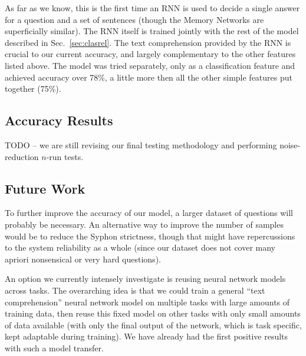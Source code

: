 \documentclass[11pt,a4paper]{article}
\begin{document}
As far as we know, this is the first time an RNN is used to decide a single answer for a question and a set of sentences (though the Memory Networks are superficially similar).
The RNN itself is trained jointly with the rest of the model described in Sec.~\ref{sec:clasrel}.
The text comprehension provided by the RNN is crucial to our current accuracy, and largely complementary to the other features listed above.
The model was tried separately, only as a classification feature and achieved accuracy over 78\%, a little more then all the other simple features put together (75\%).

\subsection{Accuracy Results}

TODO -- we are still revising our final testing methodology and performing noise-reduction $n$-run tests.

\subsection{Future Work}

To further improve the accuracy of our model, a larger dataset of questions will probably be necessary.
An alternative way to improve the number of samples would be to reduce the Syphon strictness,
though that might have repercussions to the system reliability as a whole
(since our dataset does not cover many apriori nonsensical or very hard questions).

An option we currently intensely investigate is reusing neural network models across tasks.
The overarching idea is that we could train a general ``text comprehension'' neural network
model on multiple tasks with large amounts of training data, then reuse this fixed model
on other tasks with only small amounts of data available (with only the final output
of the network, which is task specific, kept adaptable during training).
We have already had the first positive results with such a model transfer.





\end{document}
